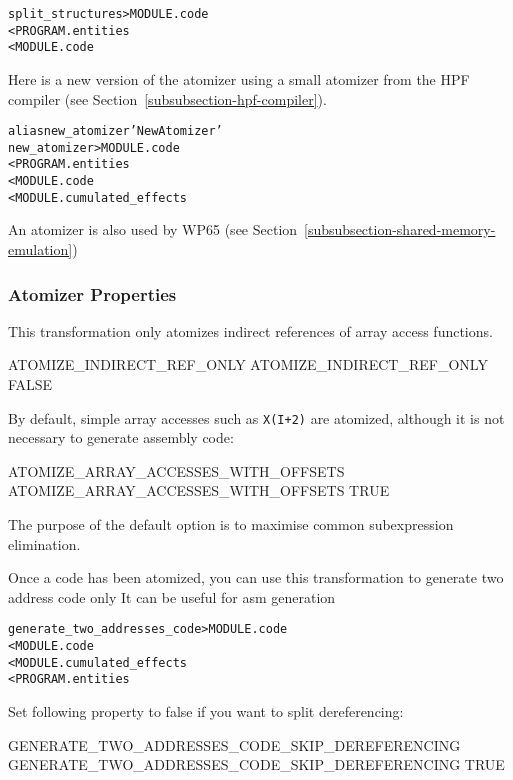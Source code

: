\documentclass[a4paper]{report}
\newenvironment{PipsMake}{\begin{alltt}}{\end{alltt}}
\newenvironment{PipsPass}[1]{\label{pass:#1}}{}
\begin{document}
\begin{PipsMake}
split_structures > MODULE.code
    < PROGRAM.entities
    < MODULE.code
\end{PipsMake}

\begin{PipsPass}{new_atomizer}
Here is a new version of the atomizer using a small atomizer from
the HPF compiler (see Section~\ref{subsubsection-hpf-compiler}).
\end{PipsPass}
\begin{PipsMake}
alias new_atomizer 'New Atomizer'
new_atomizer                      > MODULE.code
        < PROGRAM.entities
        < MODULE.code
        < MODULE.cumulated_effects
\end{PipsMake}

An atomizer is also used by WP65 (see
Section~\ref{subsubsection-shared-memory-emulation})


\subsubsection{Atomizer Properties}

This transformation only atomizes indirect references of array access
functions.

\begin{PipsProp}{ATOMIZE_INDIRECT_REF_ONLY}
ATOMIZE_INDIRECT_REF_ONLY FALSE
\end{PipsProp}

By default, simple array accesses such as \verb/X(I+2)/ are atomized,
although it is not necessary to generate assembly code:

\begin{PipsProp}{ATOMIZE_ARRAY_ACCESSES_WITH_OFFSETS}
ATOMIZE_ARRAY_ACCESSES_WITH_OFFSETS TRUE
\end{PipsProp}

The purpose of the default option is to maximise common subexpression
elimination.

\begin{PipsPass}{generate_two_addresses_code}
Once a code has been atomized, you can use this transformation to generate two address code only
It can be useful for asm generation
\end{PipsPass}
\begin{PipsMake}
generate_two_addresses_code > MODULE.code
			< MODULE.code
			< MODULE.cumulated_effects
			< PROGRAM.entities
\end{PipsMake}
Set following property to false if you want to split dereferencing:
\begin{PipsProp}{GENERATE_TWO_ADDRESSES_CODE_SKIP_DEREFERENCING}
GENERATE_TWO_ADDRESSES_CODE_SKIP_DEREFERENCING TRUE
\end{PipsProp}
\end{document}
